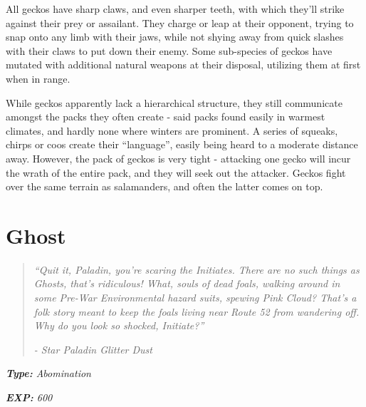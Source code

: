 \documentclass[11pt,a4paper,twocolumn]{book}
\begin{document}
	All geckos have sharp claws, and even sharper teeth, with which they'll strike against their prey or assailant. They charge or leap at their opponent, trying to snap onto any limb with their jaws, while not shying away from quick slashes with their claws to put down their enemy. Some sub-species of geckos have mutated with additional natural weapons at their disposal, utilizing them at first when in range.
	
	While geckos apparently lack a hierarchical structure, they still communicate amongst the packs they often create - said packs found easily in warmest climates, and hardly none where winters are prominent. A series of squeaks, chirps or coos create their ``language'', easily being heard to a moderate distance away. However, the pack of geckos is very tight - attacking one gecko will incur the wrath of the entire pack, and they will seek out the attacker. Geckos fight over the same terrain as salamanders, and often the latter comes on top.
	
	\clearpage
	
	\section*{Ghost}
	\begin{quote}
		\emph{``Quit it, Paladin, you're scaring the Initiates. There are no such things as Ghosts, that's ridiculous! What, souls of dead foals, walking around in some Pre-War Environmental hazard suits, spewing Pink Cloud? That's a folk story meant to keep the foals living near Route 52 from wandering off. Why do you look so shocked, Initiate?''}
		
		\emph{-	Star Paladin Glitter Dust}
	\end{quote}
	
	\noindent
	\emph{\textbf{Type:} Abomination}
	
	\noindent
	\emph{\textbf{EXP:} 600}
	
%		
%	
%		
\end{document}
